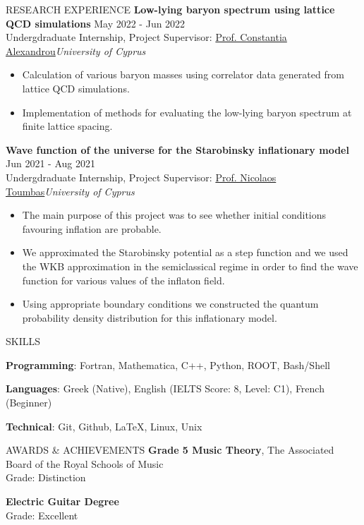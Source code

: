 \documentclass{resume} %
\begin{document}
\begin{rSection}{RESEARCH EXPERIENCE}
\textbf{Low-lying baryon spectrum using lattice QCD simulations} \hfill May 2022 - Jun 2022\\
Undergdraduate Internship, Project Supervisor:  \href{https://www.cyi.ac.cy/index.php/castorc/about-the-center/castorc-our-people/itemlist/user/99-constantia-alexandrou.html}{Prof. Constantia Alexandrou}\hfill \textit{University of Cyprus}
\begin{itemize}
\itemsep -3pt {} 
\item Calculation of various baryon masses using correlator data generated from lattice QCD simulations.
\item Implementation of methods for evaluating the low-lying baryon spectrum at finite lattice spacing.
\end{itemize}

\textbf{Wave function of the universe for the Starobinsky inflationary model} \hfill Jun 2021 - Aug 2021\\
Undergdraduate Internship, Project Supervisor:  \href{https://www.ucy.ac.cy/directory/en/profile/nick}{Prof. Nicolaos Toumbas}\hfill \textit{University of Cyprus}
\begin{itemize}
\itemsep -3pt {} 
\item The main purpose of this project was to see whether initial conditions favouring inflation are probable.
\item We approximated the Starobinsky potential as a step function and we used the WKB approximation in the semiclassical regime in order to find the wave function for various values of the inflaton field.
\item Using appropriate boundary conditions we constructed the quantum probability density distribution for this inflationary model.
\end{itemize}
\end{rSection} 

\bigbreak

\begin{rSection}{SKILLS}
\itemsep -3pt {} 
\item \textbf{Programming}: Fortran, Mathematica, C++, Python, ROOT, Bash/Shell
\item \textbf{Languages}: Greek (Native), English (IELTS Score: 8, Level: C1), French (Beginner)
\item \textbf{Technical}: Git, Github, \LaTeX, Linux, Unix
\end{rSection}

\bigbreak

\begin{rSection}{AWARDS \& ACHIEVEMENTS}
{\bf Grade 5 Music Theory}, The Associated Board of the Royal Schools of Music\\
Grade: Distinction

{\bf Electric Guitar Degree}\\
Grade: Excellent
\end{rSection} 
\end{document}
